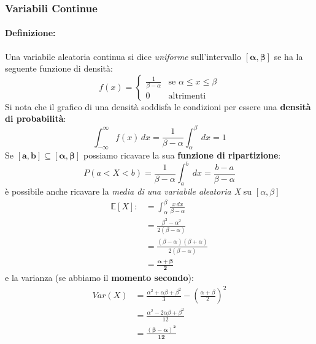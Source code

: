 \documentclass[]{article}
\newcommand{\ev}{\mathbb{E}[X]}
\renewcommand{\ev}[1]{\mathbb{E}[#1]}
\newcommand{\definizione}{\paragraph{Definizione:}}
\begin{document}
    \subsubsection{Variabili Continue}
    \definizione Una variabile aleatoria continua si dice \textit{uniforme} sull'intervallo $\boldsymbol{[\alpha, \beta]}$ se ha la seguente funzione di densità:
    \begin{equation*}
        f(x) =
        \begin{cases}
            \frac{1}{\beta - \alpha} & \text{se } \alpha \leq x \leq \beta \\
            0 & \text{altrimenti}
        \end{cases}
    \end{equation*}
    Si nota che il grafico di una densità soddisfa le condizioni per essere una \textbf{densità di probabilità}:
    \[ \int_{-\infty}^{\infty} f(x) \, dx = \frac{1}{\beta - \alpha} \int_{\alpha}^{\beta} \, dx = 1 \]
    Se $\boldsymbol{[a, b] \subseteq [\alpha, \beta]}$ possiamo ricavare la sua \textbf{funzione di ripartizione}:
    \[ P(a < X < b) = \frac{1}{\beta - \alpha} \int_{a}^{b} \, dx = \frac{b - a}{\beta - \alpha}\]
    è possibile anche ricavare la \textit{media di una variabile aleatoria X} su $[\alpha, \beta]$
    \begin{equation*}
        \begin{split}
            \ev{X} :&= \int_{\alpha}^{\beta} \frac{x \,dx}{\beta - \alpha} \\
            & = \frac{\beta^2 - \alpha^2}{2(\beta - \alpha)} \\
            & = \frac{(\beta - \alpha) (\beta + \alpha)}{2(\beta - \alpha)} \\
            & = \boldsymbol{\frac{\alpha + \beta}{2}}
        \end{split}
    \end{equation*}
    e la varianza (se abbiamo il \textbf{momento secondo}):
    \begin{equation*}
        \begin{split}
            Var(X) &= \frac{\alpha^2 + \alpha \beta + \beta^2}{3} - (\frac{\alpha + \beta}{2})^2 \\
            & = \frac{\alpha^2 - 2\alpha \beta + \beta^2}{12} \\
            & = \boldsymbol{\frac{(\beta - \alpha)^2}{12}}
        \end{split}
    \end{equation*}
\end{document}
